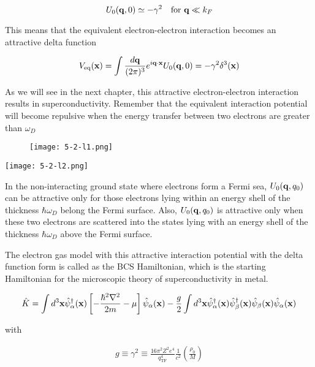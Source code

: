 \[U_0({\bf q},0)\simeq -\gamma^2\quad\text{for }{\bf q}\ll k_F \]

This means that the equivalent electron-electron interaction becomes an attractive delta function

\[V_{\text{eq}}({\bf x}) = \int\frac{d\bf q}{(2\pi)^3}e^{i\bf q\cdot x}U_0({\bf q},0) = -\gamma^2\delta^3(\bf x) \]

As we will see in the next chapter, this attractive electron-electron interaction results in superconductivity. Remember that the equivalent interaction potential will become repulsive when the energy transfer between two electrons are greater than $\omega_D$

\begin{wrapfigure}{r}{5.5cm}
\texttt{[image: 5-2-l1.png]}
\end{wrapfigure}
\texttt{[image: 5-2-l2.png]}

In the non-interacting ground state where electrons form a Fermi sea, $U_0({\bf q},q_0)$ can be attractive only for those electrons lying within an energy shell of the thickness $\hbar\omega_D$ belong the Fermi surface. Also, $U_0({\bf q},q_0)$ is attractive only when these two electrons are scattered into the states lying with an energy shell of the thickness $\hbar\omega_D$ above the Fermi surface. 

The electron gas model with this attractive interaction potential with the delta function form is called as the BCS Hamiltonian, which is the starting Hamiltonian for the microscopic theory of superconductivity in metal. 

\[\hat{K} = \int d^3{\bf x}\hat{\psi}^\dagger_\alpha({\bf x})\left[-\frac{\hbar^2\nabla^2}{2m}-\mu\right]\hat{\psi}_\alpha({\bf x}) - \frac{g}{2}\int d^3{\bf x} \hat{\psi}^\dagger_\alpha({\bf x})\hat{\psi}^\dagger_\beta({\bf x})\hat{\psi}_\beta({\bf x})\hat{\psi}_\alpha({\bf x})\]

with

\begin{align}\tag{C}
g\equiv\gamma^2\equiv\frac{16\pi^2 Z^2 e^4}{q_{\text{TF}}^4}\frac{1}{c^2}\left(\frac{\rho_0}{M}\right) \end{align}



